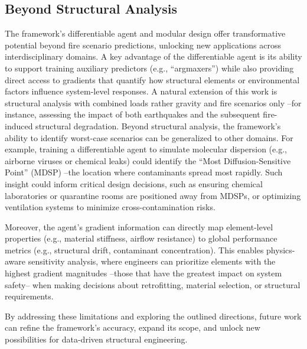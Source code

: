 {\subsection{Beyond Structural Analysis}
The framework's differentiable agent and modular design offer transformative potential beyond fire scenario predictions, unlocking new applications across interdisciplinary domains. A key advantage of the differentiable agent is its ability to support training auxiliary predictors (e.g., ``argmaxers'') while also providing direct access to gradients that quantify how structural elements or environmental factors influence system-level responses. A natural extension of this work is structural analysis with combined loads rather gravity and fire scenarios only --for instance, assessing the impact of both earthquakes and the subsequent fire-induced structural degradation. Beyond structural analysis, the framework's ability to identify worst-case scenarios can be generalized to other domains. For example, training a differentiable agent to simulate molecular dispersion (e.g., airborne viruses or chemical leaks) could identify the ``Most Diffusion-Sensitive Point'' (MDSP) --the location where contaminants spread most rapidly. Such insight could inform critical design decisions, such as ensuring chemical laboratories or quarantine rooms are positioned away from MDSPs, or optimizing ventilation systems to minimize cross-contamination risks.

Moreover, the agent’s gradient information can directly map element-level properties (e.g., material stiffness, airflow resistance) to global performance metrics (e.g., structural drift, contaminant concentration). This enables physics-aware sensitivity analysis, where engineers can prioritize elements with the highest gradient magnitudes --those that have the greatest impact on system safety-- when making decisions about retrofitting, material selection, or structural requirements.

By addressing these limitations and exploring the outlined directions, future work can refine the framework’s accuracy, expand its scope, and unlock new possibilities for data-driven structural engineering.

} 